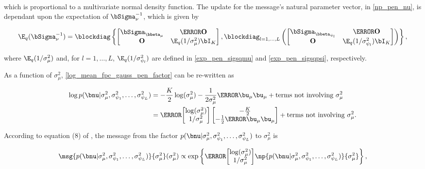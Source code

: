 \documentclass[12pt]{article}
\theoremstyle{plain}
\theoremstyle{definition}
\theoremstyle{remark}
\def\Sigmanu{\bSigma_{\nu}}
\def\sigsqmu{\sigma^2_{\mu}}
\def\betamu{\bbeta_\mu}
\def\umu{\bu_\mu}
\newcommand\betapsi[1]{\bbeta_{\psi_{#1}}}
\newcommand\sigsqpsi[1]{\sigma^2_{\psi_{#1}}}
\newcommand\tni[1]{\text{terms not involving $#1$}}
\begin{document}
\noindent which is proportional to a multivariate normal density function.
The update for the message's natural parameter vector, in \eqref{np_pen_nu},
is dependant upon the expectation of $\Sigmanu^{-1}$, which is given by

\[
	\E_q (\Sigmanu^{-1}) =
		\blockdiag \left\{
			\begin{bmatrix}
				\bSigma_{\betamu} & \T{\textbf{O}} \\
				\textbf{O} & \E_q (1/\sigsqmu) \bI_K
			\end{bmatrix},
			\blockdiag_{l = 1, \dots, L} \left(
				\begin{bmatrix}
					\bSigma_{\betapsi{l}} & \T{\textbf{O}} \\
					\textbf{O} & \E_q (1/\sigsqpsi{l}) \bI_K
				\end{bmatrix}
			\right)
		\right\},
\]

\noindent where $\E_q (1/\sigsqmu)$ and, for $l = 1, \dots, L$, $\E_q (1/\sigsqpsi{l})$ are defined in
\eqref{exp_pen_sigsqmu} and \eqref{exp_pen_sigsqpsi}, respectively.

As a function of $\sigsqmu$, \eqref{log_mean_fpc_gauss_pen_factor} can be re-written as

\begin{align*}
	\log p(\bnu | \sigsqmu, \sigsqpsi{1}, \dots, \sigsqpsi{L})
		& = -\frac{K}{2} \log (\sigsqmu) - \frac{1}{2\sigsqmu} \T{\umu} \umu + \tni{\sigsqmu} \\
		& = \T{\begin{bmatrix}
			\log (\sigsqmu) \\
			1/\sigsqmu
		\end{bmatrix}} \begin{bmatrix}
			-\frac{K}{2} \\
			-\frac12 \T{\umu} \umu
		\end{bmatrix} + \tni{\sigsqmu}.
\end{align*}

\noindent According to equation (8) of \citet{wand17}, the message from the factor $p(\bnu | \sigsqmu, \sigsqpsi{1}, \dots,
\sigsqpsi{L})$ to $\sigsqmu$ is

\[
	\msg{p (\bnu | \sigsqmu, \sigsqpsi{1}, \dots, \sigsqpsi{L})}{\sigsqmu} (\sigsqmu)
		\propto
			\exp \left\{
				\T{\begin{bmatrix}
					\log (\sigsqmu) \\
					1/\sigsqmu
				\end{bmatrix}} 
				\np{p (\bnu | \sigsqmu, \sigsqpsi{1}, \dots, \sigsqpsi{L})}{\sigsqmu}
			\right\},
\]
\end{document}
